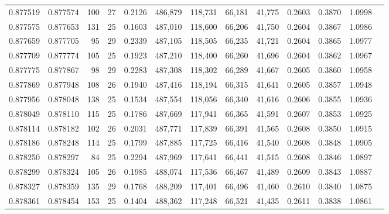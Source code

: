 \begin{tabular}{rrrrrrrrrrrrr}
0.877519 & 0.877574 &   100 &  27 &                                     0.2126 & 486,879 & 118,731 &  66,181 &  41,775 & 0.2603 & 0.3870 & 1.0998 \\
0.877575 & 0.877653 &   131 &  25 &                                     0.1603 & 487,010 & 118,600 &  66,206 &  41,750 & 0.2604 & 0.3867 & 1.0986 \\
0.877659 & 0.877705 &    95 &  29 &                                     0.2339 & 487,105 & 118,505 &  66,235 &  41,721 & 0.2604 & 0.3865 & 1.0977 \\
0.877709 & 0.877774 &   105 &  25 &                                     0.1923 & 487,210 & 118,400 &  66,260 &  41,696 & 0.2604 & 0.3862 & 1.0967 \\
0.877775 & 0.877867 &    98 &  29 &                                     0.2283 & 487,308 & 118,302 &  66,289 &  41,667 & 0.2605 & 0.3860 & 1.0958 \\
0.877869 & 0.877948 &   108 &  26 &                                     0.1940 & 487,416 & 118,194 &  66,315 &  41,641 & 0.2605 & 0.3857 & 1.0948 \\
0.877956 & 0.878048 &   138 &  25 &                                     0.1534 & 487,554 & 118,056 &  66,340 &  41,616 & 0.2606 & 0.3855 & 1.0936 \\
0.878049 & 0.878110 &   115 &  25 &                                     0.1786 & 487,669 & 117,941 &  66,365 &  41,591 & 0.2607 & 0.3853 & 1.0925 \\
0.878114 & 0.878182 &   102 &  26 &                                     0.2031 & 487,771 & 117,839 &  66,391 &  41,565 & 0.2608 & 0.3850 & 1.0915 \\
0.878186 & 0.878248 &   114 &  25 &                                     0.1799 & 487,885 & 117,725 &  66,416 &  41,540 & 0.2608 & 0.3848 & 1.0905 \\
0.878250 & 0.878297 &    84 &  25 &                                     0.2294 & 487,969 & 117,641 &  66,441 &  41,515 & 0.2608 & 0.3846 & 1.0897 \\
0.878299 & 0.878324 &   105 &  26 &                                     0.1985 & 488,074 & 117,536 &  66,467 &  41,489 & 0.2609 & 0.3843 & 1.0887 \\
0.878327 & 0.878359 &   135 &  29 &                                     0.1768 & 488,209 & 117,401 &  66,496 &  41,460 & 0.2610 & 0.3840 & 1.0875 \\
0.878361 & 0.878454 &   153 &  25 &                                     0.1404 & 488,362 & 117,248 &  66,521 &  41,435 & 0.2611 & 0.3838 & 1.0861 \\

\end{tabular}
